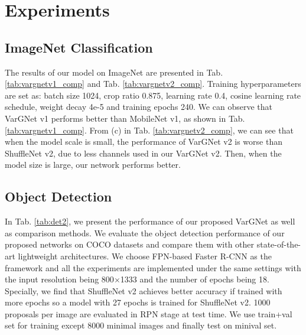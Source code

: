 \documentclass{article}
\begin{document}
\section{Experiments}
\subsection{ImageNet Classification}
The results of our model on ImageNet are presented in Tab. \ref{tab:vargnetv1_comp} and Tab. \ref{tab:vargnetv2_comp}.
Training hyperparameters are set as: batch size 1024, crop ratio 0.875, learning rate 0.4, cosine learning rate schedule, weight decay 4e-5 and training epochs 240. We can observe that VarGNet v1 performs better than MobileNet v1, as shown in Tab. \ref{tab:vargnetv1_comp}. From (c) in Tab. \ref{tab:vargnetv2_comp}, we can see that when the model scale is small, the performance of VarGNet v2 is worse than ShuffleNet v2, due to less channels used in our VarGNet v2. Then, when the model size is large, our network performs better.

\subsection{Object Detection}

In Tab. \ref{tab:det2}, we present the performance of our proposed VarGNet as well as comparison methods. 
We evaluate the object detection performance of our proposed networks on COCO datasets \cite{Lin2014MicrosoftCC} and compare them with other state-of-the-art lightweight architectures.  We choose FPN-based Faster R-CNN \cite{Lin2017FeaturePN} as the framework and all the experiments are implemented under the same settings with the input resolution being 800$\times$1333 and the number of epochs being 18. Specially, we find that ShuffleNet v2 achieves better accuracy if trained with more epochs so a model with 27 epochs is trained for ShuffleNet v2. 1000 proposals per image are evaluated in RPN stage at test time.  We use train+val set for training except 8000 minimal images and finally test on minival set. 
\end{document}
